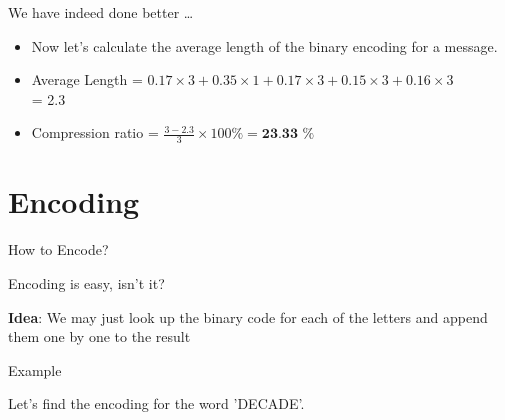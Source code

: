 \documentclass{beamer}
\begin{document}
\begin{frame}{We have indeed done better \ldots}
	
	\begin{block}{}
		\centering
		\begin{itemize}
			\item Now let's calculate the average length of the binary encoding for a message. \\
			
			\item Average Length = $0.17 \times 3 + 0.35 \times 1 + 0.17 \times 3 + 0.15 \times 3 + 0.16 \times 3$  \\
			
			\hspace{26mm} = 2.3
			
			\item Compression ratio = $\frac{3-2.3}{3} \times 100 \% = \textbf{23.33 \%} $
			
		\end{itemize}
		
		
		
	\end{block}
	
	
\end{frame}
	
	\section{Encoding}
	\setbeamercovered{}
	\begin{frame}{How to Encode?}
		
		\begin{block}{Encoding is easy, isn't it?}
			
			\textbf{Idea}: We may just look up the binary code for each of the letters and append them one by one to the result
			
		\end{block}
		
	\end{frame}
	
	\begin{frame}{Example}
		
		\begin{example}
			
			Let's find the encoding for the word 'DECADE'.
			
		\end{example}
		
	\end{frame}
	
\end{document}
